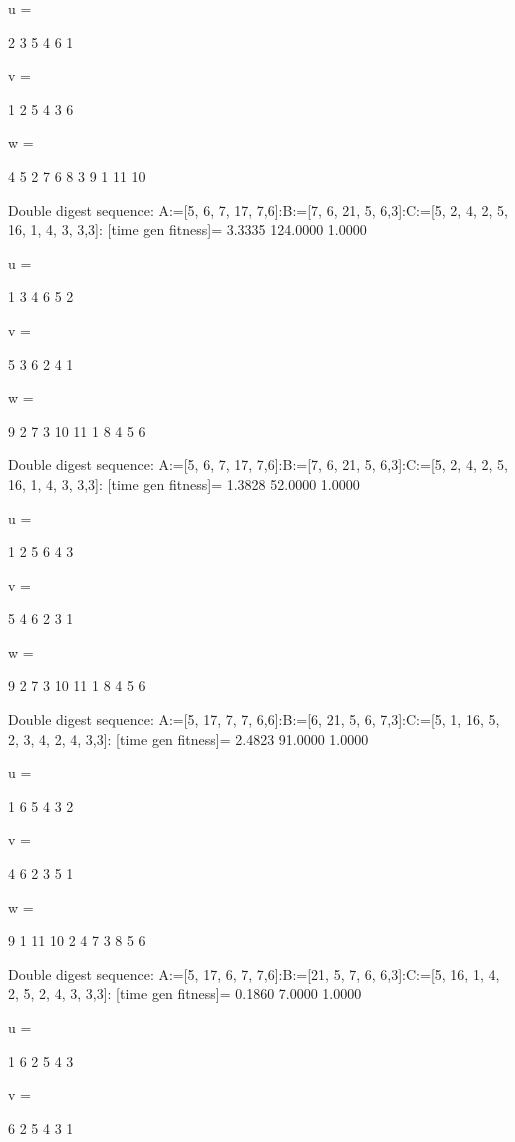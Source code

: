 u =

     2     3     5     4     6     1


v =

     1     2     5     4     3     6


w =

     4     5     2     7     6     8     3     9     1    11    10

Double digest sequence:
A:=[5, 6, 7, 17, 7,6]:B:=[7, 6, 21, 5, 6,3]:C:=[5, 2, 4, 2, 5, 16, 1, 4, 3, 3,3]:
[time gen fitness]=
    3.3335  124.0000    1.0000


u =

     1     3     4     6     5     2


v =

     5     3     6     2     4     1


w =

     9     2     7     3    10    11     1     8     4     5     6

Double digest sequence:
A:=[5, 6, 7, 17, 7,6]:B:=[7, 6, 21, 5, 6,3]:C:=[5, 2, 4, 2, 5, 16, 1, 4, 3, 3,3]:
[time gen fitness]=
    1.3828   52.0000    1.0000


u =

     1     2     5     6     4     3


v =

     5     4     6     2     3     1


w =

     9     2     7     3    10    11     1     8     4     5     6

Double digest sequence:
A:=[5, 17, 7, 7, 6,6]:B:=[6, 21, 5, 6, 7,3]:C:=[5, 1, 16, 5, 2, 3, 4, 2, 4, 3,3]:
[time gen fitness]=
    2.4823   91.0000    1.0000


u =

     1     6     5     4     3     2


v =

     4     6     2     3     5     1


w =

     9     1    11    10     2     4     7     3     8     5     6

Double digest sequence:
A:=[5, 17, 6, 7, 7,6]:B:=[21, 5, 7, 6, 6,3]:C:=[5, 16, 1, 4, 2, 5, 2, 4, 3, 3,3]:
[time gen fitness]=
    0.1860    7.0000    1.0000


u =

     1     6     2     5     4     3


v =

     6     2     5     4     3     1


